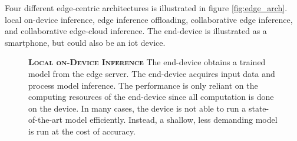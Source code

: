 Four different edge-centric architectures is illustrated in figure \ref{fig:edge_arch}. \protect{} local on-device inference, \protect{} edge inference offloading, \protect{} collaborative edge inference, and \protect{}  collaborative edge-cloud inference. The end-device is illustrated as a smartphone, but could also be an \gls{iot} device.
\begin{figure}
	\begin{minipage}{0.65\linewidth}
		\textbf{\protect{} \textsc{Local on-Device Inference}}
		\color{caption-color} \newline
		The end-device obtains a trained model from the edge server. The end-device acquires input data and process model inference. The performance is only reliant on the computing resources of the end-device since all computation is done on the device. In many cases, the device is not able to run a state-of-the-art model efficiently. Instead, a shallow, less demanding model is run at the cost of accuracy.
	\end{minipage}%
	\hfill
	\begin{minipage}{0.3\linewidth}
		\centering
		\captionsetup[subfigure]{justification=centering}
		\begin{figure}
			\centering
		\end{figure}
	\end{minipage}
	

\end{figure}
